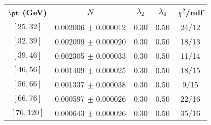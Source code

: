\begin{tabular}{c||c|c|c|c}
$\pt$ (GeV) & $N$ & $\lambda_{2}$ & $\lambda_4$  & $\chi^2$/ndf  \\
\hline
$[25, 32]$ & 0.002006 $\pm$ 0.000012 & 0.30 & 0.50 & 24/12\\
$[32, 39]$ & 0.002099 $\pm$ 0.000020 & 0.30 & 0.50 & 18/13\\
$[39, 46]$ & 0.002305 $\pm$ 0.000033 & 0.30 & 0.50 & 11/14\\
$[46, 56]$ & 0.001409 $\pm$ 0.000025 & 0.30 & 0.50 & 18/15\\
$[56, 66]$ & 0.001337 $\pm$ 0.000038 & 0.30 & 0.50 & 9/15\\
$[66, 76]$ & 0.000597 $\pm$ 0.000026 & 0.30 & 0.50 & 22/16\\
$[76, 120]$ & 0.000643 $\pm$ 0.000026 & 0.30 & 0.50 & 35/16\\
\end{tabular}
